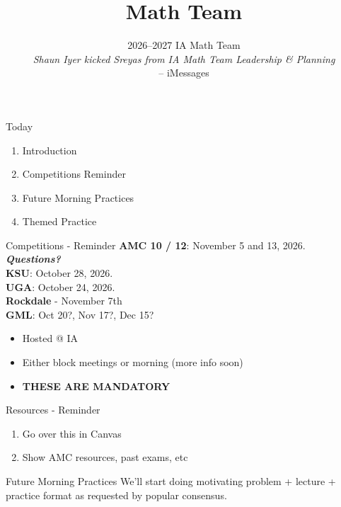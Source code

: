 \documentclass[aspectratio=169,xcolor=dvipsnames]{beamer}
\title[Math Team]{Math Team}
\subtitle{2026--2027 IA Math Team\\[0.8em]\textit{Shaun Iyer kicked Sreyas from IA Math Team Leadership \& Planning}\\[-0.2em]{\scriptsize -- iMessages}}
\begin{document}
\begin{frame}
    \titlepage
\end{frame}

\begin{frame}[t]{Today}
\vspace{0.35cm}
\begin{enumerate}
    \item Introduction
    \item Competitions Reminder
    \item Future Morning Practices
    \item Themed Practice
\end{enumerate}
\end{frame}

\begin{frame}[t]{Competitions - Reminder}
\vspace{0.35cm}
\textbf{AMC 10 / 12}: November 5 and 13, 2026. \textbf{\textit{Questions?}} \\
\textbf{KSU}: October 28, 2026. \\
\textbf{UGA}: October 24, 2026. \\
\textbf{Rockdale} - November 7th \\
\textbf{GML}: Oct 20?, Nov 17?, Dec 15?\\
\begin{itemize}
    \small \item Hosted @ IA
    \item Either block meetings or morning (more info soon)
    \item \textbf{THESE ARE MANDATORY}
\end{itemize}
\end{frame}

\begin{frame}[t]{Resources - Reminder}
\begin{enumerate}
    \item Go over this in Canvas
    \item Show AMC resources, past exams, etc
\end{enumerate}
\end{frame}


\begin{frame}[t]{Future Morning Practices}
    We'll start doing motivating problem + lecture + practice format as requested by popular consensus.
\end{frame}
\end{document}
